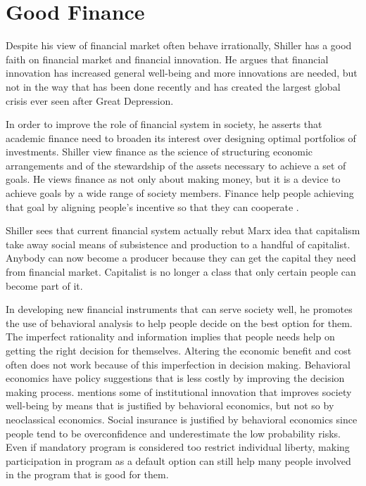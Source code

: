 \documentclass[a4paper, 12pt]{article}
\begin{document}
\section{Good Finance}

Despite his view of financial market often behave irrationally, Shiller has a good faith on financial market and financial innovation. He argues that financial innovation has increased general well-being and more innovations are needed, but not in the way that has been done recently and has created the largest global crisis ever seen after Great Depression.

In order to improve the role of financial system in society, he asserts that academic finance need to broaden its interest over designing optimal portfolios of investments. Shiller view finance as the science of structuring economic arrangements and of the stewardship of the assets necessary to achieve a set of goals. He views finance as not only about making money, but it is a device to achieve goals by a wide range of society members. Finance help people achieving that goal by aligning people's incentive so that they can cooperate \citep{shiller2013finance}.

Shiller sees that current financial system actually rebut Marx idea that capitalism take away social means of subsistence and production to a handful of capitalist. Anybody can now become a producer because they can get the capital they need from financial market. Capitalist is no longer a class that only certain people can become part of it. 

In developing new financial instruments that can serve society well, he promotes the use of behavioral analysis to help people decide on the best option for them. The imperfect rationality and information implies that people needs help on getting the right decision for themselves. Altering the economic benefit and cost often does not work because of this imperfection in decision making. Behavioral economics have policy suggestions that is less costly by improving the decision making process. \citet{shiller2005behavioral} mentions some of institutional innovation that improves society well-being by means that is justified by behavioral economics, but not so by neoclassical economics. Social insurance is justified by behavioral economics since people tend to be overconfidence and underestimate the low probability risks. Even if mandatory program is considered too restrict individual liberty, making participation in program as a default option can still help many people involved in the program that is good for them.
\end{document}
